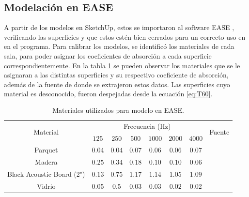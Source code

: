 \subsection{Modelación en EASE}
A partir de los modelos en SketchUp, estos se importaron al software EASE \cite{ease}, verificando las superficies y que estos estén bien cerrados para un correcto uso en en el programa. Para calibrar los modelos, se identificó los materiales de cada sala, para poder asignar los coeficientes de absorción a cada superficie correspondientemente. En la tabla \ref{tab:materiales-ease} se pueden observar los materiales que se le asignaran a las distintas superficies y su respectivo coeficiente de absorción, además de la fuente de donde se extrajeron estos datos. Las superficies cuyo material es desconocido, fueron despejadas desde la ecuación \ref{eq:T60}.



\begin{table}[H]
\centering
    \begin{tabular}{|c|cccccc|c|}
    \hline
    \multirow{2}{*}{Material} & \multicolumn{6}{c|}{Frecuencia (Hz)}                                                                          & \multirow{2}{*}{Fuente} \\ \cline{2-7} 
            & \multicolumn{1}{c|}{$125$} & \multicolumn{1}{c|}{$250$} & \multicolumn{1}{c|}{$500$} & \multicolumn{1}{c|}{$1000$} & \multicolumn{1}{c|}{$2000$} & $4000$ & \\ \hline
    Parquet & \multicolumn{1}{c|}{$0.04$} & \multicolumn{1}{c|}{$0.04$} & \multicolumn{1}{c|}{$0.07$} & \multicolumn{1}{c|}{$0.06$} & \multicolumn{1}{c|}{$0.06$} &  $0.07$ & \cite{Recuero}\\ \hline
    Madera  & \multicolumn{1}{c|}{$0.25$} & \multicolumn{1}{c|}{$0.34$} & \multicolumn{1}{c|}{$0.18$} & \multicolumn{1}{c|}{$0.10$} & \multicolumn{1}{c|}{$0.10$} &  $0.06$ & \cite{Recuero}\\  \hline
    Black Acoustic Board (2") & \multicolumn{1}{c|}{$0.13$} & \multicolumn{1}{c|}{$0.75$} & \multicolumn{1}{c|}{$1.17$} & \multicolumn{1}{c|}{$1.14$} & \multicolumn{1}{c|}{$1.05$} & $1.09$ & \cite{blackboard}\\ \hline
    Vidrio  & \multicolumn{1}{c|}{$0.05$} & \multicolumn{1}{c|}{$0.5$} & \multicolumn{1}{c|}{$0.03$} & \multicolumn{1}{c|}{$0.03$} & \multicolumn{1}{c|}{$0.02$} & $0.02$ & \cite{Recuero}\\ \hline
    \end{tabular}
    \caption{Materiales utilizados para modelo en EASE.}
    \label{tab:materiales-ease}
\end{table}

